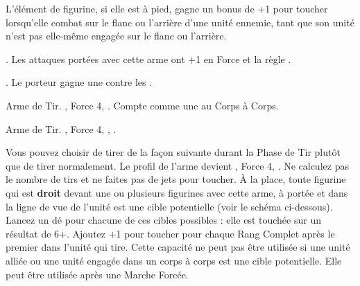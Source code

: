 L'élément de figurine, si elle est à pied, gagne un bonus de +1 pour toucher lorsqu'elle combat sur le flanc ou l'arrière d'une unité ennemie, tant que son unité n'est pas elle-même engagée sur le flanc ou l'arrière.

\closearmyspecialrules





\vspace{1.5cm}
\startarmyarmoury

\startitemlistonecol

\listitemonecol{\infernalweapon{}} \hw{}. Les attaques portées avec cette arme ont +1 en Force et la règle \magicalattacks{}.

\listitemonecol{\infernalarmour{}} \platearmour{}. Le porteur gagne une  contre les \flamingattacks{}.

\listitemonecol{\flintlockaxe{}} Arme de Tir. , Force 4, . Compte comme une \halberd{} au Corps à Corps.

\listitemonecol{\blunderbuss{}} Arme de Tir. , Force 4, \walloflead{}, \quicktofire{}.

\enditemlistonecol

\noindent\textbf{\walloflead}

\vspace{5pt}
Vous pouvez choisir de tirer de la façon suivante durant la Phase de Tir plutôt que de tirer normalement. Le profil de l'arme devient , Force 4, \reload{}. Ne calculez pas le nombre de tirs et ne faites pas de jets pour toucher. À la place, toute figurine qui est \textbf{droit} devant une ou plusieurs figurines avec cette arme, à portée et dans la ligne de vue de l'unité est une cible potentielle (voir le schéma ci-dessous). Lancez un dé pour chacune de ces cibles possibles : elle est touchée sur un résultat de 6+. Ajoutez +1 pour toucher pour chaque Rang Complet après le premier dans l'unité qui tire. Cette capacité ne peut pas être utilisée si une unité alliée ou une unité engagée dans un corps à corps est une cible potentielle. Elle peut être utilisée après une Marche Forcée.

\newcommand{\blunderbussfire}{\Largerfontsize\textit{Feu !}}
\def\svgwidth{10cm}
\vspace{0.5cm}\begin{center}

\end{center}

\closearmyarmoury

